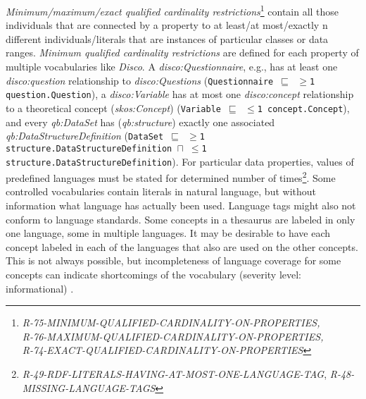 \documentclass{llncs}
\newcommand{\ms}[1]{\texttt{#1}}
\begin{document}
\emph{Minimum/maximum/exact qualified cardinality restrictions}\footnote{\emph{R-75-MINIMUM-QUALIFIED-CARDINALITY-ON-PROPERTIES, \\ R-76-MAXIMUM-QUALIFIED-CARDINALITY-ON-PROPERTIES, \\ R-74-EXACT-QUALIFIED-CARDINALITY-ON-PROPERTIES}} contain all those individuals that are connected by a property to at least/at most/exactly n different individuals/literals that are instances of particular classes or data ranges.
\emph{Minimum qualified cardinality restrictions} are defined for each property of multiple vocabularies like \emph{Disco}.
A \emph{disco:Questionnaire}, e.g., has at least one \emph{disco:question} relationship to \emph{disco:Questions} (\ms{Questionnaire $\sqsubseteq$ $\geq$1 question.Question}),
a \emph{disco:Variable} has at most one \emph{disco:concept} relationship to a theoretical concept (\emph{skos:Concept}) (\ms{Variable $\sqsubseteq$ $\leq$1 concept.Concept}), and every \emph{qb:DataSet} has (\emph{qb:structure}) exactly one associated \emph{qb:DataStructureDefinition} (\ms{DataSet $\sqsubseteq$ $\geq$1 structure.DataStructureDefinition $\sqcap$ $\leq$1 structure.DataStructureDefinition}).
For particular data properties, values of predefined languages must be stated for determined number of times\footnote{{\em R-49-RDF-LITERALS-HAVING-AT-MOST-ONE-LANGUAGE-TAG}, {\em R-48-MISSING-LANGUAGE-TAGS}}.
Some controlled vocabularies contain literals in natural language, but without information what language has actually been used. Language tags might also not conform to language standards. 
Some concepts in a thesaurus are labeled in only one language, some in multiple languages. It may be desirable to have each concept labeled in each of the languages that also are used on the other concepts. This is not always possible, but incompleteness of language coverage for some concepts can indicate shortcomings of the vocabulary
(severity level: informational) \cite{MaderHaslhoferIsaac2012}.
\end{document}
